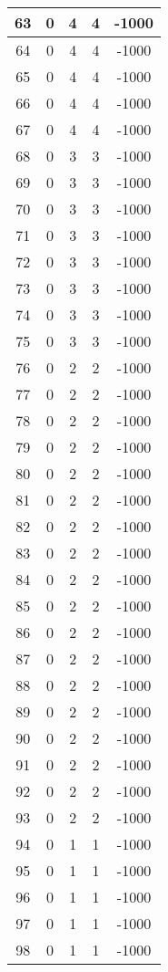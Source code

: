 \documentclass[letterpaper, 12pt]{article}
\begin{document}
\begin{longtable}{|c|c|c|c|c|}
\hline
63 & 0 & 4 & 4 & -1000 \\
\hline
64 & 0 & 4 & 4 & -1000 \\
\hline
65 & 0 & 4 & 4 & -1000 \\
\hline
66 & 0 & 4 & 4 & -1000 \\
\hline
67 & 0 & 4 & 4 & -1000 \\
\hline
68 & 0 & 3 & 3 & -1000 \\
\hline
69 & 0 & 3 & 3 & -1000 \\
\hline
70 & 0 & 3 & 3 & -1000 \\
\hline
71 & 0 & 3 & 3 & -1000 \\
\hline
72 & 0 & 3 & 3 & -1000 \\
\hline
73 & 0 & 3 & 3 & -1000 \\
\hline
74 & 0 & 3 & 3 & -1000 \\
\hline
75 & 0 & 3 & 3 & -1000 \\
\hline
76 & 0 & 2 & 2 & -1000 \\
\hline
77 & 0 & 2 & 2 & -1000 \\
\hline
78 & 0 & 2 & 2 & -1000 \\
\hline
79 & 0 & 2 & 2 & -1000 \\
\hline
80 & 0 & 2 & 2 & -1000 \\
\hline
81 & 0 & 2 & 2 & -1000 \\
\hline
82 & 0 & 2 & 2 & -1000 \\
\hline
83 & 0 & 2 & 2 & -1000 \\
\hline
84 & 0 & 2 & 2 & -1000 \\
\hline
85 & 0 & 2 & 2 & -1000 \\
\hline
86 & 0 & 2 & 2 & -1000 \\
\hline
87 & 0 & 2 & 2 & -1000 \\
\hline
88 & 0 & 2 & 2 & -1000 \\
\hline
89 & 0 & 2 & 2 & -1000 \\
\hline
90 & 0 & 2 & 2 & -1000 \\
\hline
91 & 0 & 2 & 2 & -1000 \\
\hline
92 & 0 & 2 & 2 & -1000 \\
\hline
93 & 0 & 2 & 2 & -1000 \\
\hline
94 & 0 & 1 & 1 & -1000 \\
\hline
95 & 0 & 1 & 1 & -1000 \\
\hline
96 & 0 & 1 & 1 & -1000 \\
\hline
97 & 0 & 1 & 1 & -1000 \\
\hline
98 & 0 & 1 & 1 & -1000 \\

\end{longtable}
\end{document}
